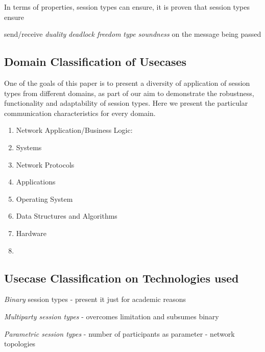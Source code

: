In terms of properties, session types can ensure, it is proven
that session types ensure

send/receive {\em duality}
{\em deadlock freedom}
{\em type soundness} on the message being passed




\subsection{Domain Classification of Usecases}

One of the goals of this paper is to present a diversity
of application of session types from different domains, as
part of our aim to demonstrate the robustness, functionality
and adaptability of session types. Here we present the particular
communication characteristics for every domain.


\begin{enumerate}
	\item	Network Application/Business Logic:

	\item	Systems

	\item	Network Protocols

	\item	Applications

	\item	Operating System

	\item	Data Structures and Algorithms

	\item	Hardware

	\item	{}
\end{enumerate}


\subsection{Usecase Classification on Technologies used}


{\em Binary} session types - present it just for academic reasons

{\em Multiparty session types} - overcomes limitation and subsumes binary

{\em Parametric session types} - number of participants as parameter - network topologies

